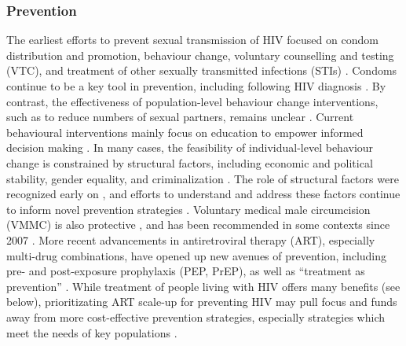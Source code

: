 \subsubsection{Prevention}\label{intro.hiv.resp.prev}
The earliest efforts to prevent sexual transmission of HIV focused on
condom distribution and promotion, behaviour change, voluntary counselling and testing (VTC),
and treatment of other sexually transmitted infections (STIs) \cite{Royce1997,Marseille2002}.
Condoms continue to be a key tool in prevention,
including following HIV diagnosis \cite{Tiwari2020}.
By contrast, the effectiveness of population-level behaviour change interventions,
such as to reduce numbers of sexual partners, remains unclear \cite{Gregson2009}.
Current behavioural interventions mainly focus on
education to empower informed decision making \cite{Faust2018}.
In many cases, the feasibility of individual-level behaviour change
is constrained by structural factors, including
economic and political stability, gender equality, and criminalization \cite{Gupta2008}.
The role of structural factors were recognized early on \cite{Parker2000},
and efforts to understand and address these factors continue to inform novel prevention strategies
\cite{Gupta2008,Beyrer2012,McBride2021}.
Voluntary medical male circumcision (VMMC) is also protective \cite{Auvert2005},
and has been recommended in some contexts since 2007 \cite{WHO2020vmmc}.
More recent advancements in antiretroviral therapy (ART), especially multi-drug combinations,
have opened up new avenues of prevention, including
pre- and post-exposure prophylaxis (PEP, PrEP), as well as
``treatment as prevention'' \cite{Hosseinipour2002}.
While treatment of people living with HIV offers many benefits
(see  below),
prioritizating ART scale-up for preventing HIV
may pull focus and funds away from more cost-effective prevention strategies,
especially strategies which meet the needs of key populations
\cite{Shelton2010,Cohen2012,Baral2019}.
